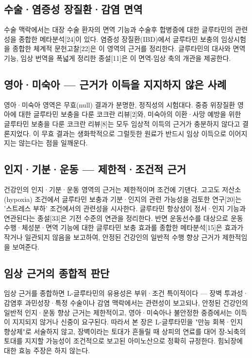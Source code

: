 \documentclass[12pt,oneside]{book}
\begin{document}
\subsection{수술·염증성 장질환·감염 면역}

수술 맥락에서는 대장 수술 환자의 면역 기능과 수술후 합병증에 대한 글루타민의 관련성을 종합한 메타분석[24]이 있다. 염증성 장질환(IBD)에서 글루타민 보충의 임상시험을 종합한 체계적 문헌고찰[22]은 이 영역의 근거를 정리한다. 글루타민의 대사와 면역 기능, 임상 번역을 폭넓게 정리한 종설[11]은 이 면역-임상 축의 개관을 제공한다.

\subsection{영아·미숙아 — 근거가 이득을 지지하지 않은 사례}

영아·미숙아 영역은 무효(null) 결과가 분명한, 정직성의 시험대다. 중증 위장질환 영아에 대한 글루타민 보충을 다룬 코크란 리뷰[2]와, 미숙아의 이환·사망 예방을 위한 글루타민 보충을 다룬 코크란 리뷰[8]는 모두 임상적 이득의 근거가 충분하지 않다고 결론지었다. 이 무효 결과는 생화학적으로 그럴듯한 원료가 반드시 임상 이득으로 이어지지는 않는다는 점을 일깨운다.

\subsection{인지·기분·운동 — 제한적·조건적 근거}

건강인의 인지·기분·운동 영역의 근거는 제한적이며 조건에 기댄다. 고고도 저산소(hypoxia) 조건에서 글루타민 보충과 기분·인지의 관련 가능성을 검토한 연구[20]는 '스트레스 부하' 조건에서의 관련성을 시사한다. 글루타민 항상성이 정서·인지 기능과 연관된다는 종설[33]은 기전 수준의 연관을 정리한다. 반면 운동선수를 대상으로 운동 수행·체성분·면역 기능에 대한 글루타민 보충 효과를 종합한 메타분석[15]은 효과가 작거나 일관되지 않음을 보고하여, 안정된 건강인의 일반적 수행 향상 근거가 제한적임을 보여준다.

\subsection{임상 근거의 종합적 판단}

임상 근거를 종합하면 L-글루타민의 유용성은 부위·조건 특이적이다 — 장벽 투과성·감염후 과민성장·특정 수술이나 감염 맥락에서는 관련성이 보고되나, 안정된 건강인의 일반적 인지·운동 향상 근거는 제한적이고, 영아·미숙아나 불안정한 중증에서는 이득이 지지되지 않거나 신중이 요구된다. 따라서 본 장은 L-글루타민을 "만능 회복·인지 향상제"로 서술하지 않고, 장벽이라는 토대가 흔들릴 때 상피의 연료를 대어 장-뇌축의 토대를 지지할 가능성이 조건적으로 보고된 아미노산으로 정확히 규정한다. 힘뇌장에 대한 효능 주장은 하지 않는다.
\end{document}
